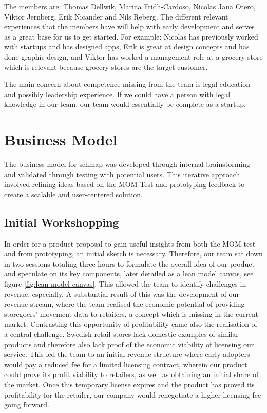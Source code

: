 \documentclass[titlepage]{article}
\begin{document}
The members are: Thomas Dellwik, Marina Fridh-Cardoso, Nicolas Jaua Otero, Viktor Jernberg, Erik Nicander and Nils Reberg. The different relevant experiences that the members have will help with early development and serves as a great base for us to get started. For example: Nicolas has previously worked with startups and has designed apps, Erik is great at design concepts and has done graphic design, and Viktor has worked a management role at a grocery store which is relevant because grocery stores are the target customer.

The main concern about competence missing from the team  is legal education and possibly leadership experience. If we could have a person with legal knowledge in our team, our team would essentially be complete as a startup.

\section{Business Model}
The business model for schmap was developed through internal brainstorming and validated through testing with potential users. 
This iterative approach involved refining ideas based on the MOM Test and prototyping feedback to create a scalable and user-centered solution.




\subsection{Initial Workshopping}
In order for a product proposal to gain useful insights from both the MOM test and from prototyping, an initial sketch is necessary. Therefore, our team sat down in two sessions totaling three hours to formulate the overall idea of our product and speculate on its key components, later detailed as a lean model canvas, see figure \ref{fig:lean-model-canvas}.
This allowed the team to identify challenges in revenue, especially. 
A substantial result of this was the development of our revenue stream, where the team realised the economic potential of providing storegoers' movement data to retailers, a concept which is missing in the current market.
Contrasting this opportunity of profitability came also the realisation of a central challenge. Swedish retail stores lack domestic examples of similar products and therefore also lack proof of the economic viability of licensing our service. 
This led the team to an initial revenue structure where early adopters would pay a reduced fee for a limited licensing contract, wherein our product could prove its profit viability to retailers, as well as obtaining an initial share of the market. Once this temporary license expires and the product has proved its profitability for the retailer, our company would renegotiate a higher licensing fee going forward.
\end{document}
